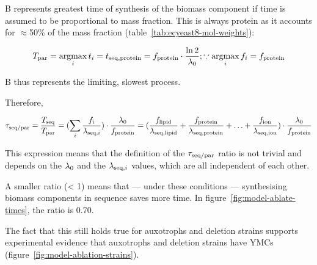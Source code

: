 B represents greatest time of synthesis of the biomass component if time is assumed to be proportional to mass fraction.
This is always protein as it accounts for $\approx$50\% of the mass fraction (table~\ref{tab:ecyeast8-mol-weights}):

\begin{equation}
  T_{\mathrm{par}} = \operatorname*{argmax}_{i} t_{i} = t_{\mathrm{seq},\mathrm{protein}} = f_{\mathrm{protein}} \cdot \frac{\ln 2}{\lambda_{0}}; \because \operatorname*{argmax}_{i} f_{i} = f_{\mathrm{protein}}
  \label{eq:model-b}
\end{equation}

B thus represents the limiting, slowest process.

Therefore,

\begin{equation}
  \tau_{\mathrm{seq}/\mathrm{par}} = \frac{T_{\mathrm{seq}}}{T_{\mathrm{par}}} = (\sum_i \frac{f_i}{\lambda_{\mathrm{seq},i}}) \cdot \frac{\lambda_{0}}{f_{\mathrm{protein}}} = (\frac{f_{\mathrm{lipid}}}{\lambda_{\mathrm{seq},\mathrm{lipid}}} + \frac{f_{\mathrm{protein}}}{\lambda_{\mathrm{seq},\mathrm{protein}}} + \ldots + \frac{f_{\mathrm{ion}}}{\lambda_{\mathrm{seq},\mathrm{ion}}}) \cdot \frac{\lambda_{0}}{f_{\mathrm{protein}}}
  \label{eq:model-ratio}
\end{equation}

This expression means that the definition of the $\tau_{\mathrm{seq}/\mathrm{par}}$ ratio is not trivial and depends on the $\lambda_{0}$ and the $\lambda_{\mathrm{seq},i}$ values, which are all independent of each other.

A smaller ratio (< 1) means that --- under these conditions --- synthesising biomass components in sequence saves more time.
In figure~\ref{fig:model-ablate-times}, the ratio is 0.70.

The fact that this still holds true for auxotrophs and deletion strains supports experimental evidence that auxotrophs and deletion strains have YMCs (figure~\ref{fig:model-ablation-strains}).

